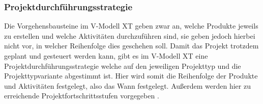  \subsubsection{Projektdurchführungsstrategie}
 Die Vorgehensbausteine im V-Modell XT geben zwar an, welche Produkte jeweils zu erstellen und welche Aktivitäten durchzuführen sind, sie geben jedoch hierbei nicht vor, in welcher Reihenfolge dies geschehen soll. Damit das Projekt trotzdem geplant und gesteuert werden kann, gibt es im V-Modell XT eine Projektdurchführungsstrategie welche auf den jeweiligen Projekttyp und die Projekttypvariante abgestimmt ist. Hier wird somit die Reihenfolge der Produkte und Aktivitäten festgelegt, also das  \grqq Wann\grqq {} festgelegt. Außerdem werden hier zu erreichende Projektfortschrittsstufen vorgegeben \cite{2004vmodell}. \newline
 
